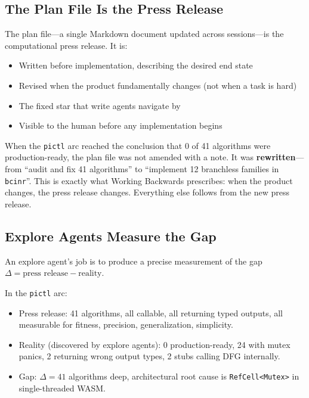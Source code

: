 \documentclass[11pt,a4paper]{article}
\newcommand{\code}[1]{\texttt{#1}}
\newcommand{\gap}{\Delta}
\begin{document}
\subsection{The Plan File Is the Press Release}

The plan file---a single Markdown document updated across sessions---is the
computational press release.  It is:

\begin{itemize}
  \item Written before implementation, describing the desired end state
  \item Revised when the product fundamentally changes (not when a task is hard)
  \item The fixed star that write agents navigate by
  \item Visible to the human before any implementation begins
\end{itemize}

When the \code{pictl} arc reached the conclusion that 0 of 41 algorithms were
production-ready, the plan file was not amended with a note.  It was
\textbf{rewritten}---from ``audit and fix 41 algorithms'' to ``implement 12
branchless families in \code{bcinr}''.  This is exactly what Working Backwards
prescribes: when the product changes, the press release changes.  Everything
else follows from the new press release.

\subsection{Explore Agents Measure the Gap}

An explore agent's job is to produce a precise measurement of the gap
$\gap = \text{press release} - \text{reality}$.

In the \code{pictl} arc:

\begin{itemize}
  \item Press release: 41 algorithms, all callable, all returning typed outputs,
    all measurable for fitness, precision, generalization, simplicity.
  \item Reality (discovered by explore agents): 0 production-ready, 24 with
    mutex panics, 2 returning wrong output types, 2 stubs calling DFG
    internally.
  \item Gap: $\gap = 41$ algorithms deep, architectural root cause is
    \code{RefCell<Mutex>} in single-threaded WASM.
\end{itemize}
\end{document}
